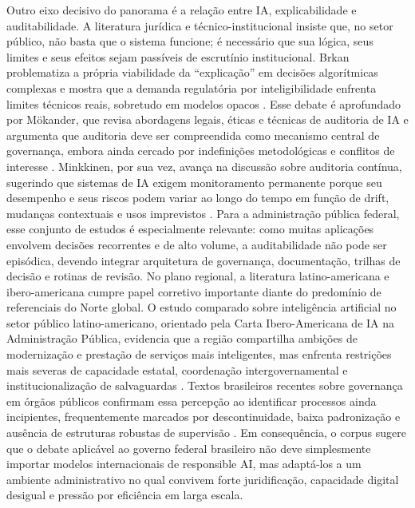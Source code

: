 \documentclass[12pt,a4paper]{article}
\begin{document}
Outro eixo decisivo do panorama é a relação entre IA, explicabilidade e auditabilidade. A literatura jurídica e técnico-institucional insiste que, no setor público, não basta que o sistema funcione; é necessário que sua lógica, seus limites e seus efeitos sejam passíveis de escrutínio institucional. Brkan problematiza a própria viabilidade da “explicação” em decisões algorítmicas complexas e mostra que a demanda regulatória por inteligibilidade enfrenta limites técnicos reais, sobretudo em modelos opacos \autocite{brkan2020legal}. Esse debate é aprofundado por Mökander, que revisa abordagens legais, éticas e técnicas de auditoria de IA e argumenta que auditoria deve ser compreendida como mecanismo central de governança, embora ainda cercado por indefinições metodológicas e conflitos de interesse \autocite{mkander2023auditing}. Minkkinen, por sua vez, avança na discussão sobre auditoria contínua, sugerindo que sistemas de IA exigem monitoramento permanente porque seu desempenho e seus riscos podem variar ao longo do tempo em função de drift, mudanças contextuais e usos imprevistos \autocite{minkkinen2022continuous}. Para a administração pública federal, esse conjunto de estudos é especialmente relevante: como muitas aplicações envolvem decisões recorrentes e de alto volume, a auditabilidade não pode ser episódica, devendo integrar arquitetura de governança, documentação, trilhas de decisão e rotinas de revisão.
No plano regional, a literatura latino-americana e ibero-americana cumpre papel corretivo importante diante do predomínio de referenciais do Norte global. O estudo comparado sobre inteligência artificial no setor público latino-americano, orientado pela Carta Ibero-Americana de IA na Administração Pública, evidencia que a região compartilha ambições de modernização e prestação de serviços mais inteligentes, mas enfrenta restrições mais severas de capacidade estatal, coordenação intergovernamental e institucionalização de salvaguardas \autocite{criado2024inteligencia}. Textos brasileiros recentes sobre governança em órgãos públicos confirmam essa percepção ao identificar processos ainda incipientes, frequentemente marcados por descontinuidade, baixa padronização e ausência de estruturas robustas de supervisão \autocite{goulart2025processos} \autocite{serra2024a}. Em consequência, o corpus sugere que o debate aplicável ao governo federal brasileiro não deve simplesmente importar modelos internacionais de responsible AI, mas adaptá-los a um ambiente administrativo no qual convivem forte juridificação, capacidade digital desigual e pressão por eficiência em larga escala.
\end{document}
